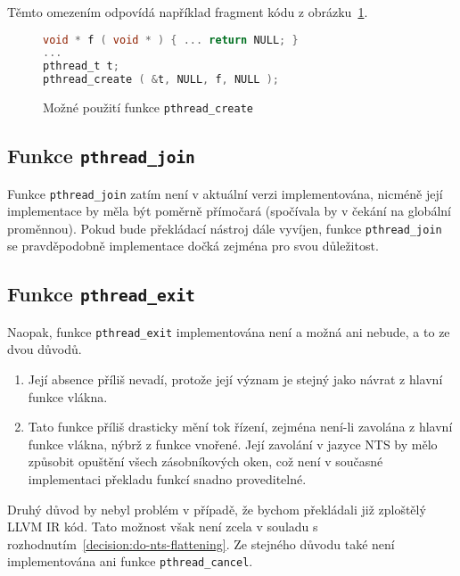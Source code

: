 \documentclass[12pt]{fithesis2}
\begin{document}
Těmto omezením odpovídá například fragment kódu z obrázku~\ref{fig:pthread-create-usage-c}.
\begin{figure}[h!]
\begin{lstlisting}[language=C]
void * f ( void * ) { ... return NULL; }
...
pthread_t t;
pthread_create ( &t, NULL, f, NULL );
\end{lstlisting}
\caption{Možné použití funkce \texttt{pthread\_create}}
\label{fig:pthread-create-usage-c}
\end{figure}

\subsection{Funkce \texttt{pthread\_join}}
Funkce \texttt{pthread\_join} zatím není v aktuální verzi implementována, nicméně její implementace by měla být poměrně přímočará (spočívala by v čekání na globální proměnnou). Pokud bude překládací nástroj dále vyvíjen, funkce \texttt{pthread\_join} se pravděpodobně implementace dočká zejména pro svou důležitost.

\subsection{Funkce \texttt{pthread\_exit}}
Naopak, funkce \texttt{pthread\_exit} implementována není a možná ani nebude, a to ze dvou důvodů.
\begin{enumerate}
\item Její absence příliš nevadí, protože její význam je stejný jako návrat z hlavní funkce vlákna.
\item Tato funkce příliš drasticky mění tok řízení, zejména není-li zavolána z hlavní funkce vlákna, nýbrž z funkce vnořené. Její zavolání v jazyce NTS by mělo způsobit opuštění všech zásobníkových oken, což není v současné implementaci překladu funkcí snadno proveditelné.
\end{enumerate}
Druhý důvod by nebyl problém v případě, že bychom překládali již zploštělý LLVM IR kód. Tato možnost však není zcela v souladu s rozhodnutím~\ref{decision:do-nts-flattening}. Ze stejného důvodu také není implementována ani funkce \texttt{pthread\_cancel}.

\end{document}
